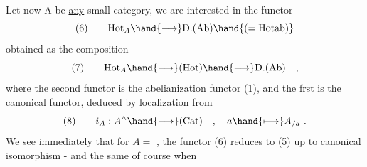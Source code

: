 Let now A be \uline{any} small category, we are interested in the
functor
\[ (6) \qquad \mathrm{Hot}_{A} \hand{\longrightarrow} \mathrm{D.(Ab)}\hand{(=\mathrm{Hotab})} \]
obtained as the composition
\[ (7) \qquad \mathrm{Hot}_{A} \hand{\longrightarrow} (\mathrm{Hot}) \hand{\longrightarrow} \mathrm{D.(Ab)} \quad , \]
where the second functor is the abelianization functor (1), and the
frst is the canonical functor, deduced by localization from
\[ (8) \qquad i_{A} : A^{\wedge} \hand{\longrightarrow} (\mathrm{Cat}) \quad , \quad a \hand{\longmapsto} A_{/a} \ . \]
We see immediately that for $A = $ \hand{$\Delta$} , the functor (6) reduces to
(5) up to canonical isomorphism - and the same of course  when


